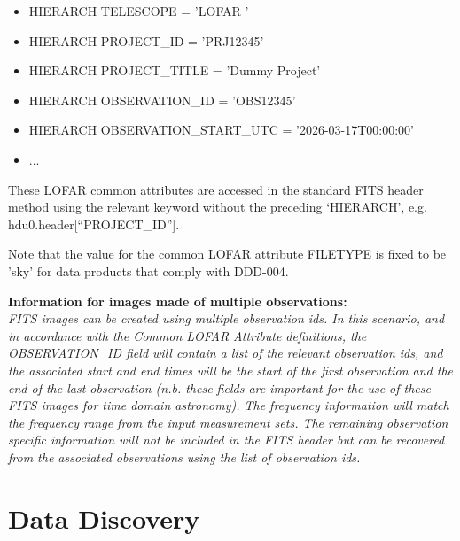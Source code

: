 \documentclass[a4paper,10pt,bibtotoc]{scrartcl}
\begin{document}
\begin{itemize}
    \item HIERARCH TELESCOPE = 'LOFAR   '
    \item HIERARCH PROJECT\_ID = 'PRJ12345'
    \item HIERARCH PROJECT\_TITLE = 'Dummy Project'
    \item HIERARCH OBSERVATION\_ID = 'OBS12345'
    \item HIERARCH OBSERVATION\_START\_UTC = '2026-03-17T00:00:00'
    \item ...
\end{itemize}

These LOFAR common attributes are accessed in the standard FITS header method using the relevant keyword without the preceding `HIERARCH', e.g. hdu0.header[``PROJECT\_ID''].

Note that the value for the common LOFAR attribute FILETYPE is fixed to be 'sky' for data products that comply with DDD-004.

{\bf Information for images made of multiple observations:}\\
{\it FITS images can be created using multiple observation ids. In this scenario, and in accordance with the Common LOFAR Attribute definitions, the OBSERVATION\_ID field will contain a list of the relevant observation ids, and the associated start and end times will be the start of the first observation and the end of the last observation (n.b. these fields are important for the use of these FITS images for time domain astronomy). The frequency information will match the frequency range from the input measurement sets. The remaining observation specific information will not be included in the FITS header but can be recovered from the associated observations using the list of observation ids.
}




\newpage



\newpage
\section{Data Discovery}
\end{document}
